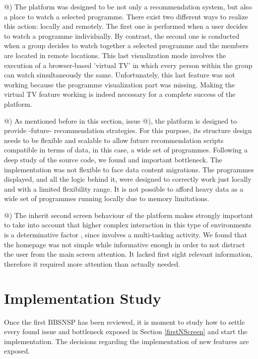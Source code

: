 \documentclass{acm_proc_article-sp}
\makeatletter
\newcommand*{\rom}[1]{\expandafter\@slowromancap\romannumeral #1@}
\makeatother
\begin{document}
\rom{4}) The platform was designed to be not only a recommendation system, but also a place to watch a selected programme. There exist two different ways to realize this action: locally and remotely. 
The first one is performed when a user decides to watch a programme individually. By contrast, the second one is conducted when a group decides to watch together a selected programme and the members are located in remote locations. This last visualization mode involves the execution of a browser-based 'virtual TV' in which every person within the group can watch simultaneously the same. Unfortunately,  this last feature was not working because the programme visualization part was missing. Making the virtual TV feature working is indeed necessary for a complete success of the platform. 

\rom{5}) As mentioned before in this section, issue \rom{1}), the platform is designed to provide -future- recommendation strategies. For this purpose, its  structure design needs to be flexible and scalable to allow future recommendation scripts compatible in terms of data, in this case, a wide set of programmes. Following a deep study of the source code, we found and important bottleneck. The implementation was not flexible to face data content migrations. The programmes displayed, and all the logic behind it, were designed to correctly work just locally and with a limited flexibility range. It is not possible to afford heavy data as a wide set of programmes running locally due to memory limitations. 


\rom{6}) The inherit second screen behaviour of the platform makes strongly important to take into account that higher complex interaction in this type of environments is a determinative factor \cite{cruickshank2007making}, since involves a multi-tasking activity. We found that the homepage was not simple while informative enough in order to not distract the user from the main screen attention. It lacked first sight relevant information, therefore it required more attention than actually needed. 

\section{Implementation Study}
Once the first BBSNSP has been reviewed, it is moment to study how to settle every found issue and bottleneck exposed in Section \ref{firstNScreen} and start the implementation. The decisions regarding the implementation of new features are exposed. 
\end{document}
